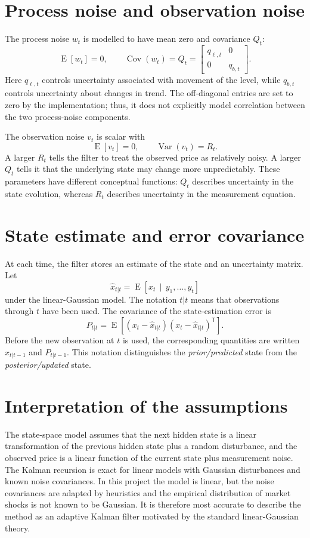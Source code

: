 \documentclass[12pt,a4paper,oneside]{report}
\numberwithin{equation}{chapter}
\numberwithin{figure}{chapter}
\numberwithin{table}{chapter}
\theoremstyle{definition}
\theoremstyle{plain}
\DeclareMathOperator{\Var}{Var}
\DeclareMathOperator{\Cov}{Cov}
\DeclareMathOperator{\E}{E}
\newcommand{\1}{\mathbf{1}}
\newcommand{\trans}{^{\mathsf T}}
\newcommand{\given}{\,\mid\,}
\newcommand{\hatt}[1]{\widehat{#1}}
\begin{document}
\section{Process noise and observation noise}
The process noise $w_t$ is modelled to have mean zero and covariance $Q_t$:
\begin{equation}
  \E[w_t]=0,\qquad \Cov(w_t)=Q_t
  =\begin{bmatrix}q_{\ell,t}&0\\0&q_{b,t}\end{bmatrix}.
  \label{eq:Q}
\end{equation}
Here $q_{\ell,t}$ controls uncertainty associated with movement of the level, while $q_{b,t}$ controls uncertainty about changes in trend. The off-diagonal entries are set to zero by the implementation; thus, it does not explicitly model correlation between the two process-noise components.

The observation noise $v_t$ is scalar with
\begin{equation}
  \E[v_t]=0,\qquad \Var(v_t)=R_t.
  \label{eq:R}
\end{equation}
A larger $R_t$ tells the filter to treat the observed price as relatively noisy. A larger $Q_t$ tells it that the underlying state may change more unpredictably. These parameters have different conceptual functions: $Q_t$ describes uncertainty in the state evolution, whereas $R_t$ describes uncertainty in the measurement equation.

\section{State estimate and error covariance}
At each time, the filter stores an estimate of the state and an uncertainty matrix. Let
\[
  \hatt{x}_{t|t}=\E[x_t\given y_1,\ldots,y_t]
\]
under the linear-Gaussian model. The notation $t|t$ means that observations through $t$ have been used. The covariance of the state-estimation error is
\begin{equation}
  P_{t|t}=\E\left[(x_t-\hatt{x}_{t|t})(x_t-\hatt{x}_{t|t})\trans\right].
\end{equation}
Before the new observation at $t$ is used, the corresponding quantities are written $\hatt{x}_{t|t-1}$ and $P_{t|t-1}$. This notation distinguishes the \emph{prior/predicted} state from the \emph{posterior/updated} state.

\section{Interpretation of the assumptions}
The state-space model assumes that the next hidden state is a linear transformation of the previous hidden state plus a random disturbance, and the observed price is a linear function of the current state plus measurement noise. The Kalman recursion is exact for linear models with Gaussian disturbances and known noise covariances. In this project the model is linear, but the noise covariances are adapted by heuristics and the empirical distribution of market shocks is not known to be Gaussian. It is therefore most accurate to describe the method as an adaptive Kalman filter motivated by the standard linear-Gaussian theory.
\end{document}
